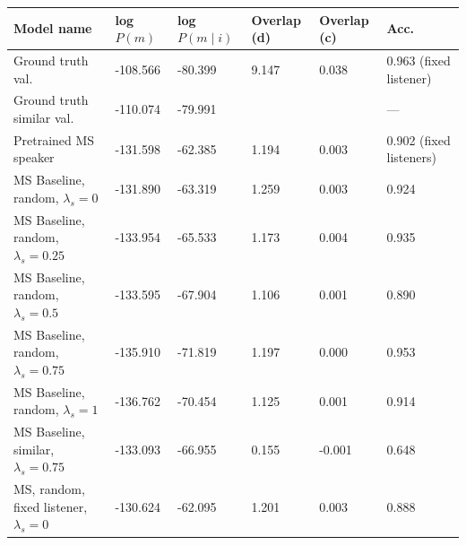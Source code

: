 \begin{table}[]
	\begin{tabularx}{\textwidth}{|X|l|l|X|X|X|}
		\hline
		\textbf{Model name}                                    & \textbf{log $P(m)$} & \textbf{log $P(m \mid i)$} & \textbf{Overlap (d)} & \textbf{Overlap (c)} & \textbf{Acc. } \\ \hline
		Ground truth val.               &     -108.566            &          -80.399             &    9.147           &       0.038          &  0.963 (fixed listener)                  \\ \hline
		Ground truth similar val.               &     -110.074        &       -79.991           &             &           &      ---         \\ \hline
		Pretrained MS speaker               &      -131.598            &           -62.385             &          1.194            &           0.003           & 0.902 (fixed listeners)                 \\ \hline
		MS Baseline, random, $\lambda_s = 0$      &     -131.890              &         -63.319               &        1.259       &         0.003             &             0.924                        \\ \hline
		MS Baseline, random, $\lambda_s = 0.25$    &      -133.954             &          -65.533              &          1.173            &       0.004               &           0.935               \\ \hline
		MS Baseline, random, $\lambda_s = 0.5$      &         -133.595         &           -67.904             &        1.106              &        0.001              &             0.890                 \\ \hline
		MS Baseline, random, $\lambda_s = 0.75$   &       -135.910            &             -71.819          &        1.197              &        0.000              & 0.953                \\ \hline
		MS Baseline, random, $\lambda_s =1$  &      -136.762             &          -70.454              &         1.125             &          0.001            &                   0.914         \\ \hline
		MS Baseline, similar, $\lambda_s = 0.75$  &     -133.093              &       -66.955                &               0.155       &       -0.001               &        0.648            \\ \hline
		MS, random, fixed listener, $\lambda_s = 0$  &         -130.624         &           -62.095             &     1.201                 &        0.003              &                          0.888               \\ \hline

\end{tabularx}
\end{table}
